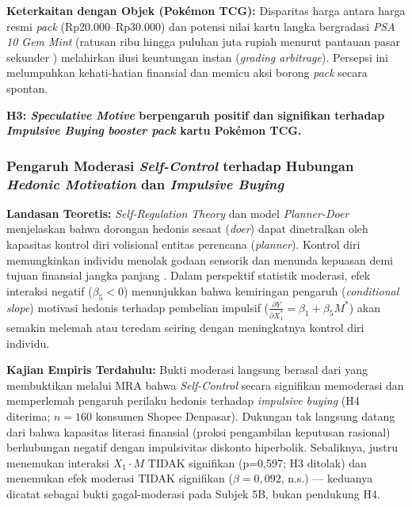 \documentclass[12pt,a4paper]{article}
\numberwithin{equation}{section}
\numberwithin{table}{section}
\numberwithin{figure}{section}
\begin{document}
\noindent\textbf{Keterkaitan dengan Objek (Pok\'emon TCG):} Disparitas harga antara harga resmi \emph{pack} (Rp20.000--Rp30.000) dan potensi nilai kartu langka bergradasi \emph{PSA 10 Gem Mint} (ratusan ribu hingga puluhan juta rupiah menurut pantauan pasar sekunder \citep{pricecharting2024}) melahirkan ilusi keuntungan instan (\emph{grading arbitrage}). Persepsi ini melumpuhkan kehati-hatian finansial dan memicu aksi borong \emph{pack} secara spontan.

\vspace{0.2cm}
\textbf{H3: \emph{Speculative Motive} berpengaruh positif dan signifikan terhadap \emph{Impulsive Buying} \emph{booster pack} kartu Pok\'emon TCG.}

\subsubsection{Pengaruh Moderasi \emph{Self-Control} terhadap Hubungan \emph{Hedonic Motivation} dan \emph{Impulsive Buying}}

\noindent\textbf{Landasan Teoretis:} \emph{Self-Regulation Theory} \citep{baumeister2002yield} dan model \emph{Planner-Doer} \citep{thaler1981economic} menjelaskan bahwa dorongan hedonis sesaat (\emph{doer}) dapat dinetralkan oleh kapasitas kontrol diri volisional entitas perencana (\emph{planner}). Kontrol diri memungkinkan individu menolak godaan sensorik dan menunda kepuasan demi tujuan finansial jangka panjang \citep{tangney2004high}. Dalam perspektif statistik moderasi, efek interaksi negatif ($\beta_5 < 0$) menunjukkan bahwa kemiringan pengaruh (\emph{conditional slope}) motivasi hedonis terhadap pembelian impulsif ($\frac{\partial Y}{\partial X_1^*} = \beta_1 + \beta_5 M^*$) akan semakin melemah atau teredam seiring dengan meningkatnya kontrol diri individu.

\noindent\textbf{Kajian Empiris Terdahulu:} Bukti moderasi langsung berasal dari \citet{lienardy2026role} yang membuktikan melalui MRA bahwa \emph{Self-Control} secara signifikan memoderasi dan memperlemah pengaruh perilaku hedonis terhadap \emph{impulsive buying} (H4 diterima; $n=160$ konsumen Shopee Denpasar). Dukungan tak langsung datang dari \citet{katauke2023financial} bahwa kapasitas literasi finansial (proksi pengambilan keputusan rasional) berhubungan negatif dengan impulsivitas diskonto hiperbolik. Sebaliknya, \citet{apidana2022peran} justru menemukan interaksi $X_1 \cdot M$ TIDAK signifikan (p=0,597; H3 ditolak) dan \citet{artadita2024how} menemukan efek moderasi TIDAK signifikan ($\beta=0{,}092$, n.s.) — keduanya dicatat sebagai bukti gagal-moderasi pada Subjek 5B, bukan pendukung H4.
\end{document}
